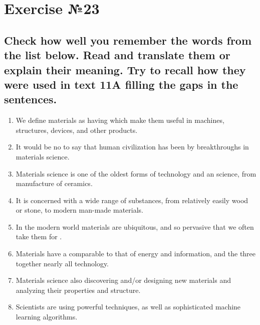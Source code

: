 \section{Exercise №23}

\subsection*{Check how well you remember the words from the list below. Read and translate them or explain their meaning. Try to recall how they were used in text 11A filling the gaps in the sentences.}
\begin{enumerate}
      \item We define materials as \underline{\hspace{3cm}} having \underline{\hspace{3cm}} which make them useful in machines, structures, devices, and other products.
      \item It would be no \underline{\hspace{3cm}} to say that human civilization has been \underline{\hspace{3cm}} by breakthroughs in materials science.
      \item Materials science is one of the oldest forms of technology and an \underline{\hspace{3cm}} science, \underline{\hspace{3cm}} from manufacture of ceramics.
      \item It is concerned with a wide range of substances, from relatively easily \underline{\hspace{3cm}} wood or stone, to modern man-made materials.
      \item In the modern world materials are ubiquitous, and so pervasive that we often take them for \underline{\hspace{3cm}}.
      \item Materials have a \underline{\hspace{3cm}} comparable to that of energy and information, and the three together \underline{\hspace{3cm}} nearly all technology.
      \item Materials science also \underline{\hspace{3cm}} discovering and/or designing new materials and analyzing their properties and structure.
      \item Scientists are using powerful \underline{\hspace{3cm}} techniques, as well as sophisticated machine learning algorithms.

\end{enumerate}
